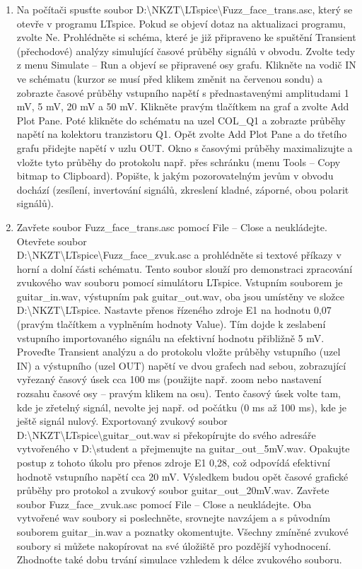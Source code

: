 \documentclass[a4paper, czech]{article}
\begin{document}
\begin{enumerate}
    \item Na počítači spusťte soubor D:\textbackslash NKZT\textbackslash LTspice\textbackslash Fuzz\_face\_trans.asc, který se otevře v programu LTspice. Pokud se objeví dotaz na aktualizaci programu, zvolte Ne. Prohlédněte si schéma, které je již připraveno ke spuštění Transient (přechodové) analýzy simulující časové průběhy signálů v obvodu. Zvolte tedy z menu Simulate – Run a objeví se připravené osy grafu. Klikněte na vodič IN ve schématu (kurzor se musí před klikem změnit na červenou sondu) a zobrazte časové průběhy vstupního napětí s přednastavenými amplitudami 1 mV, 5 mV, 20 mV a 50 mV. Klikněte pravým tlačítkem na graf a zvolte Add Plot Pane. Poté klikněte do schématu na uzel COL\_Q1 a zobrazte průběhy napětí na kolektoru tranzistoru Q1. Opět zvolte Add Plot Pane a do třetího grafu přidejte napětí v uzlu OUT. Okno s časovými průběhy maximalizujte a vložte tyto průběhy do protokolu např. přes schránku (menu Tools – Copy bitmap to Clipboard). Popište, k jakým pozorovatelným jevům v obvodu dochází (zesílení, invertování signálů, zkreslení kladné, záporné, obou polarit signálů).
    \item Zavřete soubor Fuzz\_face\_trans.asc pomocí File – Close a neukládejte. Otevřete soubor \\ D:\textbackslash NKZT\textbackslash LTspice\textbackslash Fuzz\_face\_zvuk.asc a prohlédněte si textové příkazy v horní a dolní části schématu. Tento soubor slouží pro demonstraci zpracování zvukového wav souboru pomocí simulátoru LTspice. Vstupním souborem je guitar\_in.wav, výstupním pak guitar\_out.wav, oba jsou umístěny ve složce D:\textbackslash NKZT\textbackslash LTspice. Nastavte přenos řízeného zdroje E1 na hodnotu 0,07 (pravým tlačítkem a vyplněním hodnoty Value). Tím dojde k zeslabení vstupního importovaného signálu na efektivní hodnotu přibližně 5 mV. Proveďte Transient analýzu a do protokolu vložte průběhy vstupního (uzel IN) a výstupního (uzel OUT) napětí ve dvou grafech nad sebou, zobrazující vyřezaný časový úsek cca 100 ms (použijte např. zoom nebo nastavení rozsahu časové osy – pravým klikem na osu). Tento časový úsek volte tam, kde je zřetelný signál, nevolte jej např. od počátku (0 ms až 100 ms), kde je ještě signál nulový. Exportovaný zvukový soubor D:\textbackslash NKZT\textbackslash LTspice\textbackslash guitar\_out.wav si překopírujte do svého adresáře vytvořeného v D:\textbackslash student a přejmenujte na guitar\_out\_5mV.wav. Opakujte postup z tohoto úkolu pro přenos zdroje E1 0,28, což odpovídá efektivní hodnotě vstupního napětí cca 20 mV. Výsledkem budou opět časové grafické průběhy pro protokol a zvukový soubor guitar\_out\_20mV.wav. Zavřete soubor Fuzz\_face\_zvuk.asc pomocí File – Close a neukládejte. Oba vytvořené wav soubory si poslechněte, srovnejte navzájem a s původním souborem guitar\_in.wav a poznatky okomentujte. Všechny zmíněné zvukové soubory si můžete nakopírovat na své úložiště pro pozdější vyhodnocení. Zhodnoťte také dobu trvání simulace vzhledem k délce zvukového souboru.

\end{enumerate}
\end{document}
